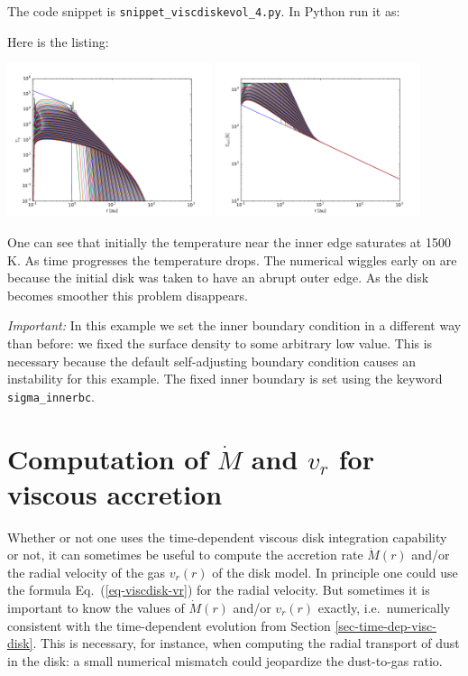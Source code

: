 \documentclass{book}
\newcommand{\code}[1]{{\small\tt #1}}
\begin{document}
The code snippet is
\code{snippet\_viscdiskevol\_4.py}. In Python run it as:
\begin{codebox}
\end{codebox}
Here is the listing:

\centerline{\includegraphics[width=0.45\textwidth]{../snippets/fig_snippet_viscdiskevol_4_1.pdf}
\includegraphics[width=0.45\textwidth]{../snippets/fig_snippet_viscdiskevol_4_2.pdf}}

One can see that initially the temperature near the inner edge saturates
at 1500 K. As time progresses the temperature drops. The numerical wiggles
early on are because the initial disk was taken to have an abrupt outer
edge. As the disk becomes smoother this problem disappears.

{\em Important:} In this example we set the inner boundary condition in a
different way than before: we fixed the surface density to some arbitrary low
value. This is necessary because the default self-adjusting boundary condition
causes an instability for this example. The fixed inner boundary is set using
the keyword \code{sigma\_innerbc}.



\section{Computation of $\dot M$ and $v_r$ for viscous accretion}
\label{sec-comp-mdot-vr}
Whether or not one uses the time-dependent viscous disk integration capability
or not, it can sometimes be useful to compute the accretion rate $\dot M(r)$
and/or the radial velocity of the gas $v_r(r)$ of the disk model. In principle
one could use the formula Eq.~(\ref{eq-viscdisk-vr}) for the radial velocity. But
sometimes it is important to know the values of $\dot M(r)$ and/or $v_r(r)$
exactly, i.e.\ numerically consistent with the time-dependent evolution from
Section \ref{sec-time-dep-visc-disk}. This is necessary, for instance, when
computing the radial transport of dust in the disk: a small numerical mismatch
could jeopardize the dust-to-gas ratio.
\end{document}
